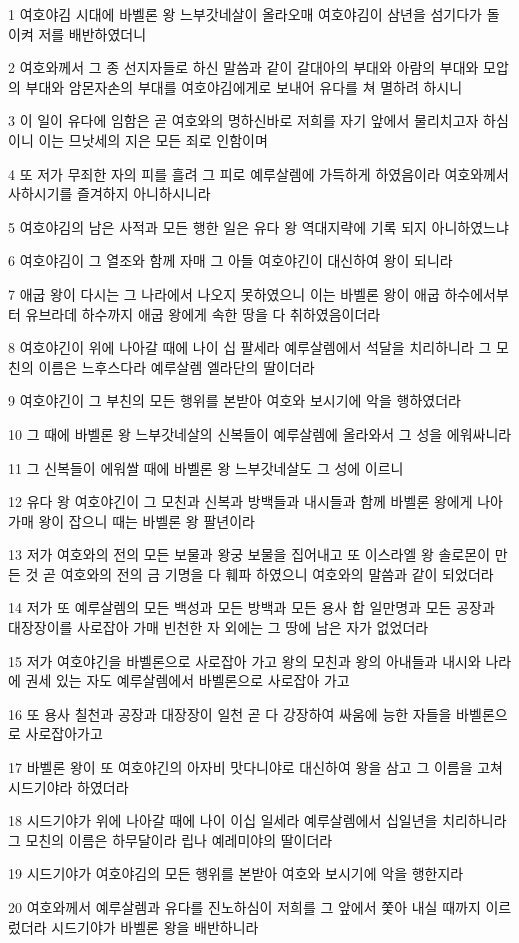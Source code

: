 \par 1 여호야김 시대에 바벨론 왕 느부갓네살이 올라오매 여호야김이 삼년을 섬기다가 돌이켜 저를 배반하였더니
\par 2 여호와께서 그 종 선지자들로 하신 말씀과 같이 갈대아의 부대와 아람의 부대와 모압의 부대와 암몬자손의 부대를 여호야김에게로 보내어 유다를 쳐 멸하려 하시니
\par 3 이 일이 유다에 임함은 곧 여호와의 명하신바로 저희를 자기 앞에서 물리치고자 하심이니 이는 므낫세의 지은 모든 죄로 인함이며
\par 4 또 저가 무죄한 자의 피를 흘려 그 피로 예루살렘에 가득하게 하였음이라 여호와께서 사하시기를 즐겨하지 아니하시니라
\par 5 여호야김의 남은 사적과 모든 행한 일은 유다 왕 역대지략에 기록 되지 아니하였느냐
\par 6 여호야김이 그 열조와 함께 자매 그 아들 여호야긴이 대신하여 왕이 되니라
\par 7 애굽 왕이 다시는 그 나라에서 나오지 못하였으니 이는 바벨론 왕이 애굽 하수에서부터 유브라데 하수까지 애굽 왕에게 속한 땅을 다 취하였음이더라
\par 8 여호야긴이 위에 나아갈 때에 나이 십 팔세라 예루살렘에서 석달을 치리하니라 그 모친의 이름은 느후스다라 예루살렘 엘라단의 딸이더라
\par 9 여호야긴이 그 부친의 모든 행위를 본받아 여호와 보시기에 악을 행하였더라
\par 10 그 때에 바벨론 왕 느부갓네살의 신복들이 예루살렘에 올라와서 그 성을 에워싸니라
\par 11 그 신복들이 에워쌀 때에 바벨론 왕 느부갓네살도 그 성에 이르니
\par 12 유다 왕 여호야긴이 그 모친과 신복과 방백들과 내시들과 함께 바벨론 왕에게 나아가매 왕이 잡으니 때는 바벨론 왕 팔년이라
\par 13 저가 여호와의 전의 모든 보물과 왕궁 보물을 집어내고 또 이스라엘 왕 솔로몬이 만든 것 곧 여호와의 전의 금 기명을 다 훼파 하였으니 여호와의 말씀과 같이 되었더라
\par 14 저가 또 예루살렘의 모든 백성과 모든 방백과 모든 용사 합 일만명과 모든 공장과 대장장이를 사로잡아 가매 빈천한 자 외에는 그 땅에 남은 자가 없었더라
\par 15 저가 여호야긴을 바벨론으로 사로잡아 가고 왕의 모친과 왕의 아내들과 내시와 나라에 권세 있는 자도 예루살렘에서 바벨론으로 사로잡아 가고
\par 16 또 용사 칠천과 공장과 대장장이 일천 곧 다 강장하여 싸움에 능한 자들을 바벨론으로 사로잡아가고
\par 17 바벨론 왕이 또 여호야긴의 아자비 맛다니야로 대신하여 왕을 삼고 그 이름을 고쳐 시드기야라 하였더라
\par 18 시드기야가 위에 나아갈 때에 나이 이십 일세라 예루살렘에서 십일년을 치리하니라 그 모친의 이름은 하무달이라 립나 예레미야의 딸이더라
\par 19 시드기야가 여호야김의 모든 행위를 본받아 여호와 보시기에 악을 행한지라
\par 20 여호와께서 예루살렘과 유다를 진노하심이 저희를 그 앞에서 쫓아 내실 때까지 이르렀더라 시드기야가 바벨론 왕을 배반하니라

